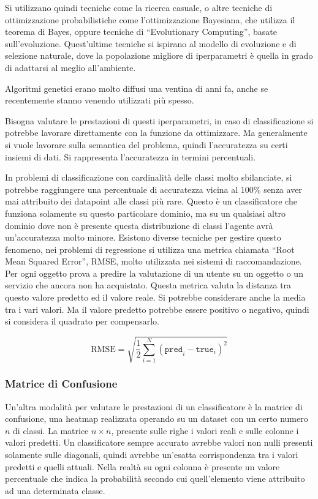 \documentclass{article}
\numberwithin{equation}{subsection}
\begin{document}
Si utilizzano quindi tecniche come la ricerca casuale, o altre tecniche di ottimizzazione 
probabilistiche come l'ottimizzazione Bayesiana, che utilizza il teorema di Bayes, oppure 
tecniche di ``Evolutionary Computing'', basate sull'evoluzione. Quest'ultime tecniche si 
ispirano al modello di evoluzione e di selezione naturale, dove la popolazione migliore di 
iperparametri è quella in grado di adattarsi al meglio all'ambiente. 

Algoritmi genetici erano molto diffusi una ventina di anni fa, anche se recentemente stanno 
venendo utilizzati più spesso. 

Bisogna valutare le prestazioni di questi iperparametri, in caso di classificazione si 
potrebbe lavorare direttamente con la funzione da ottimizzare. Ma generalmente si vuole 
lavorare sulla semantica del problema, quindi l'accuratezza su certi insiemi di dati. 
Si rappresenta l'accuratezza in termini percentuali. 

In problemi di classificazione con cardinalità delle classi molto sbilanciate, si potrebbe 
raggiungere una percentuale di accuratezza vicina al 100\% senza aver mai attribuito dei datapoint alle classi più rare. 
Questo è un classificatore che funziona solamente su questo particolare dominio, ma su un 
qualsiasi altro dominio dove non è presente questa distribuzione di classi l'agente avrà un'accuratezza molto minore. 
Esistono diverse tecniche per gestire questo fenomeno, nei problemi di regressione si utilizza 
una metrica chiamata ``Root Mean Squared Error'', RMSE, molto utilizzata nei sistemi di 
raccomandazione. Per ogni oggetto prova a predire la valutazione di un utente su un oggetto 
o un servizio che ancora non ha acquistato. Questa metrica valuta la distanza tra questo 
valore predetto ed il valore reale. Si potrebbe considerare anche la media tra i vari valori. Ma il valore predetto potrebbe essere positivo o negativo, quindi si considera il 
quadrato per compensarlo. 

\begin{equation}
    \text{RMSE}=\displaystyle\sqrt{\displaystyle\frac{1}{2}\sum_{i=1}^N\left(\texttt{pred}_i-\texttt{true}_i\right)^2}
\end{equation}

\subsubsection{Matrice di Confusione}

Un'altra modalità per valutare le prestazioni di un classificatore è la matrice di confusione, una heatmap realizzata operando su un dataset con un certo numero $n$ di classi. 
La matrice $n\times n$, presente sulle righe i valori reali e sulle colonne i valori predetti. Un classificatore sempre accurato avrebbe valori non nulli presenti solamente sulle diagonali, quindi avrebbe un'esatta corrispondenza tra i valori predetti e quelli 
attuali. Nella realtà su ogni colonna è presente un valore percentuale che indica la probabilità secondo cui quell'elemento viene attribuito ad una determinata classe. 
\end{document}
